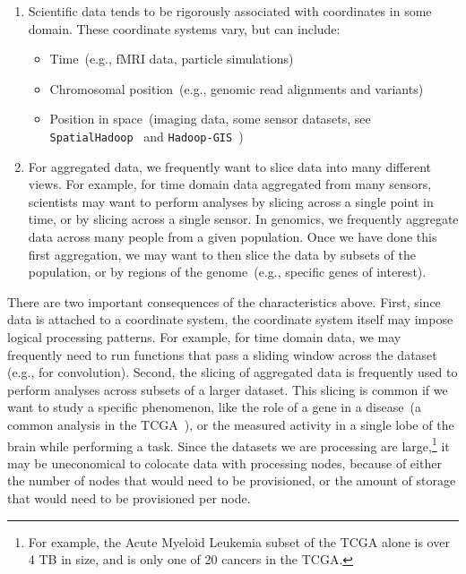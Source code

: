\documentclass{acm_proc_article-sp}
\begin{document}
\begin{enumerate}
\item Scientific data tends to be rigorously associated with coordinates in some domain. These coordinate
systems vary, but can include:
\begin{itemize}
\item Time~(e.g., fMRI data, particle simulations)
\item Chromosomal position~(e.g., genomic read alignments and variants)
\item Position in space~(imaging data, some \linebreak sensor datasets, see \texttt{SpatialHadoop}~\cite{eldawy15}
and \linebreak \texttt{Hadoop-GIS}~\cite{aji13})
\end{itemize}
\item For aggregated data, we frequently want to slice data into many different views. For example, for time
domain data aggregated from many sensors, scientists may want to perform analyses by slicing
across a single point in time, or by slicing across a single sensor. In genomics, we frequently aggregate data
across many people from a given population. Once we have done this first aggregation, we may want to then
slice the data by subsets of the population, or by regions of the genome~(e.g., specific genes of interest).
\end{enumerate}

There are two important consequences of the characteristics above. First, since data is attached to a
coordinate system, the coordinate system itself may impose logical processing patterns. For example, for
time domain data, we may frequently need to run functions that pass a sliding window across the dataset (e.g., for
convolution). Second, the slicing of aggregated data is frequently used to perform analyses across
subsets of a larger dataset. This slicing is common if we want to study a specific phenomenon, like the role of a
gene in a disease~(a common analysis in the TCGA~\cite{weinstein13}), or the measured activity in a
single lobe of the brain while performing a task. Since the datasets we are processing are
large,\footnote{For example, the Acute Myeloid Leukemia subset of the TCGA alone is over 4 TB in size, and
is only one of 20 cancers in the TCGA.} it may be uneconomical to colocate data with processing nodes,
because of either the number of nodes that would need to be provisioned, or the amount of storage that would
need to be provisioned per node.
\end{document}
